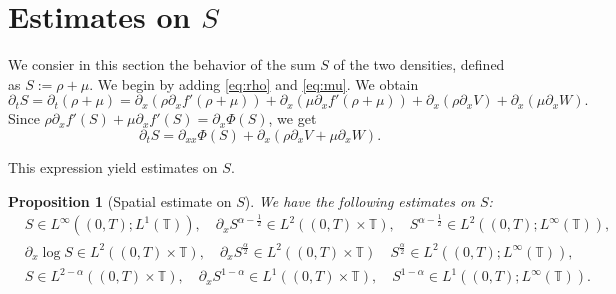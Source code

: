 \documentclass[a4paper,twosided, 11pt]{article}
\newcommand {\T}  { {\mathbb{T}} }
\theoremstyle{plain}
\newtheorem{proposition}[thm]{Proposition}
\theoremstyle{remark}
\numberwithin{equation}{section}
\begin{document}
\section{Estimates on $S$}

We consier in this section the behavior of the sum $S$ of the two densities, defined as $S:=\rho+\mu$.
We begin by adding \eqref{eq:rho} and \eqref{eq:mu}.  We obtain
$$
\partial_t S  = \partial_t(\rho+\mu)
 = \partial_x \left(\rho\partial_x f'(\rho+\mu) \right)
 + \partial_x \left(\mu\partial_x f'(\rho+\mu) \right)
 + \partial_x \left(\rho\partial_x V \right)
 + \partial_x \left(\mu\partial_x W \right).
$$
Since $\rho\partial_x f'(S)+\mu\partial_x f'(S)  = \partial_x \Phi(S)$, we get
\begin{equation}\label{eq:prelim_dS}
\partial_t S 
 =  
\partial_{xx} \Phi(S)
 + \partial_x \left(\rho\partial_x V + \mu\partial_x W \right).
\end{equation}

This expression yield estimates on $S$.

\begin{proposition}[Spatial estimate on $S$]\label{prop:spatial_S}
We have the following estimates on $S$:
\begin{align*}
&S\in L^{\infty}((0,T); L^{1}(\T)), \quad \partial_x S^{\alpha-\frac{1}{2}}\in L^{2}((0,T)\times \T),\quad S^{\alpha-\frac{1}{2}}\in L^{2}((0,T); L^{\infty}(\T)),\\
&\partial_x \log S\in L^{2}((0,T)\times \T), \quad \partial_x S^{\frac{\alpha}{2}}\in L^{2}((0,T)\times \T) \quad S^{\frac{\alpha}{2}} \in L^{2}((0,T); L^{\infty}(\T)),\\
&S\in L^{2-\alpha}((0,T)\times \T),  \quad \partial_x S^{1-\alpha}\in L^{1}((0,T)\times \T), \quad  S^{1-\alpha}\in L^{1}((0,T); L^{\infty}(\T)). 
\end{align*}
\end{proposition}
\end{document}
